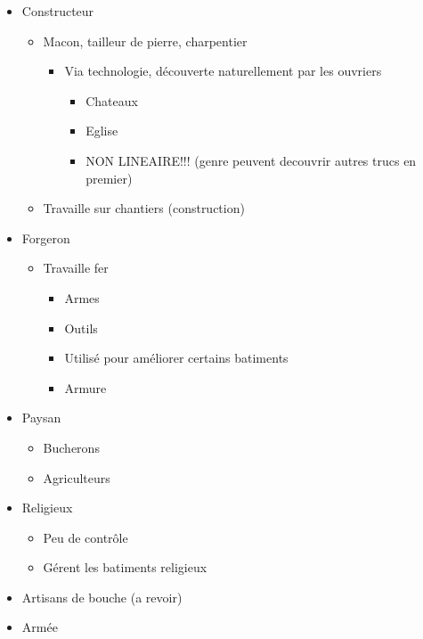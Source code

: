 \documentclass[
]{article}
\providecommand{\tightlist}{%
  \setlength{\itemsep}{0pt}\setlength{\parskip}{0pt}}
\begin{document}
\begin{itemize}
\tightlist
\item
  Constructeur

  \begin{itemize}
  \tightlist
  \item
    Macon, tailleur de pierre, charpentier

    \begin{itemize}
    \tightlist
    \item
      Via technologie, découverte naturellement par les ouvriers

      \begin{itemize}
      \tightlist
      \item
        Chateaux
      \item
        Eglise
      \item
        NON LINEAIRE!!! (genre peuvent decouvrir autres trucs en
        premier)
      \end{itemize}
    \end{itemize}
  \item
    Travaille sur chantiers (construction)
  \end{itemize}
\item
  Forgeron

  \begin{itemize}
  \tightlist
  \item
    Travaille fer

    \begin{itemize}
    \tightlist
    \item
      Armes
    \item
      Outils
    \item
      Utilisé pour améliorer certains batiments
    \item
      Armure
    \end{itemize}
  \end{itemize}
\item
  Paysan

  \begin{itemize}
  \tightlist
  \item
    Bucherons
  \item
    Agriculteurs
  \end{itemize}
\item
  Religieux

  \begin{itemize}
  \tightlist
  \item
    Peu de contrôle
  \item
    Gérent les batiments religieux
  \end{itemize}
\item
  Artisans de bouche (a revoir)
\item
  Armée


\end{itemize}
\end{document}

